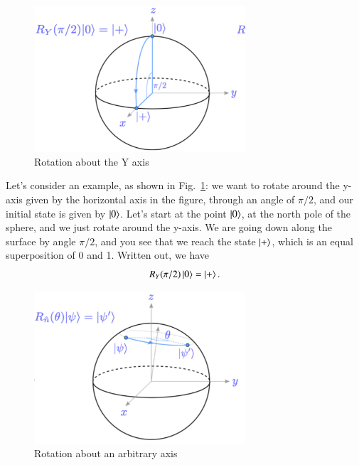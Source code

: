 \begin{figure}[H]
    \centering
    \includegraphics[width=0.7\textwidth]{lesson2/bloch_y_axis.pdf}
    
        \caption{Rotation about the Y axis}
    
    \label{fig:y-rot}
\end{figure}

Let's consider an example, as shown in Fig.~\ref{fig:y-rot}: we want to rotate around the y-axis given by the horizontal axis in the figure, through an angle of $\pi/2$, and our initial state is given by $\left| 0 \right\rangle$.  Let's start at the point $\left| 0 \right\rangle$, at the north pole of the sphere, and we just rotate around the y-axis. We are going down along the surface by angle $\pi/2$, and you see that we reach the state $\left| + \right\rangle$, which is an equal superposition of 0 and 1.  Written out, we have
\begin{equation}
R_{Y}(\pi / 2)\left| 0 \right\rangle=\left| + \right\rangle.
\end{equation}

\begin{figure}[H]
    \centering
    \includegraphics[width=0.7\textwidth]{lesson2/bloch_general_axis.pdf}
    
        \caption{Rotation about an arbitrary axis}
    
    \label{fig:arb-rot}
\end{figure}

